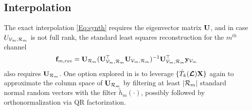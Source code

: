 \documentclass[journal, 10pt]{IEEEtran}
\begin{document}

\subsection{Interpolation}
The exact interpolation \eqref{Eq:synth} requires the eigenvector matrix ${\bf U}$, and in case $U_{\V_m,{\cal R}_m}$ is not full rank, the standard least squares reconstruction for the $m^{th}$ channel
\begin{align}
{\bf f}_{m,{rec}}=\mathbf{U}_{{\cal R}_m}(\mathbf{U}_{\V_m,{\cal R}_m}^{\top}\mathbf{U}_{\V_m,{\cal R}_m})^{-1}\mathbf{U}_{\V_m,{\cal R}_m}^{\top}{\bf y}_{\V_m}
\end{align}
also requires ${\bf U}_{{\cal R}_m}$. One option explored in \cite{halko,paratte} is to leverage $\{\bar{T}_k(\boldsymbol{\mathcal{L}}){\bf X}\}$ again to approximate the column space of ${\bf U}_{{\cal R}_m}$ by filtering at least $|{\cal R}_m|$ standard normal random vectors with the filter $\tilde{h}_m(\cdot)$, possibly followed by orthonormalization via QR factorization.
\end{document}
